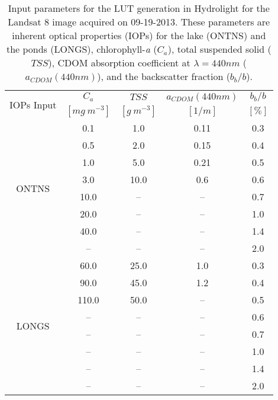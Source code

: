 \begin{table}[htb]
\caption{Input parameters for the LUT generation in Hydrolight for the Landsat 8 image acquired on 09-19-2013. These parameters are inherent optical properties (IOPs) for the lake (ONTNS) and the ponds (LONGS), chlorophyll-{\it a} ($C_a$), total suspended solid ($TSS$), CDOM absorption coefficient at $\lambda=440nm$ ($a_{CDOM}(440nm)$), and the backscatter fraction ($b_b/b$). \label{tab:LUTconc}} 
\vspace{.07cm}
\small
\centering
    \begin{tabular}{ccccc}
    \hline \hline
    \multirow{2}{*}{IOPs Input} & \bfseries{$C_a$} & \bfseries{$TSS$} & \bfseries{$a_{CDOM}(440nm)$} & \bfseries{$b_b/b$}    \\
                   & $[mg~m^{-3}]$        & $[g~m^{-3}]$       &  $[1/m]$           & $[\%]$            \\ \hline \hline
\multirow{8}{*}{ONTNS}  &  0.1      & 1.0     &  0.11   &  0.3  \\
    &  0.5      & 2.0   &  0.15     &  0.4  \\
    &  1.0      & 5.0   &  0.21     &  0.5  \\
    &  3.0      & 10.0  &  0.6      &  0.6  \\ 
    &  10.0     & --    &  --     &  0.7  \\  
    &  20.0     & --    &  --     &  1.0  \\  
    &  40.0     & --    &  --     &  1.4  \\
    &  --       & --    &  --     &  2.0  \\ \hline

\multirow{8}{*}{LONGS}   &  60.0   & 25.0    &  1.0    &  0.3  \\
    &  90.0   & 45.0    &  1.2    &  0.4  \\
    &  110.0  & 50.0    &  --     &  0.5  \\
    &  --     & --      &  --     &  0.6  \\  
    &  --     & --      &  --     &  0.7  \\  
    &  --     & --      &  --     &  1.0  \\   
    &  --     & --      &  --     &  1.4  \\  
    &  --     & --      &  --     &  2.0  \\  \hline \hline
    \end{tabular}
  \end{table}

